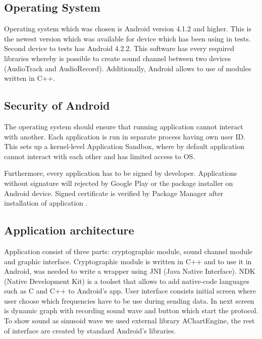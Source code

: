 \documentclass[11pt,titlepage]{article}
\theoremstyle{plain}
\begin{document}
\subsection{Operating System}

Operating system which was chosen is Android version 4.1.2 and higher. This is the newest version which was available for device which has been using in tests. Second device to tests has Android 4.2.2. This software has every required libraries whereby is possible to create sound channel between two devices (AudioTrack and AudioRecord). Additionally, Android allows to use of modules written in C++. 

\subsection{Security of Android}

The operating system should ensure that running application cannot interact with another. Each application is run in separate process having  own user ID. This sets up a kernel-level Application Sandbox, where by default application cannot interact with each other and has limited access to OS.

\vspace{5mm}

Furthermore, every application has to be signed by developer. Applications without signature will rejected by Google Play or the package installer on Android device. Signed certificate is verified by Package Manager after installation of application \cite{android_sec}.

\subsection{Application architecture}

Application consist of three parts: cryptographic module, sound channel module and graphic interface. Cryptographic module is written in C++ and to use it in Android, was needed to write a wrapper using JNI (Java Native Interface). NDK (Native Development Kit) is a toolset that allows to add native-code languages such as C and C++ to Android's app. User interface consists initial screen where user choose which frequencies have to be use during sending data. In next screen is dynamic graph with recording sound wave and button which start the protocol. To show sound as sinusoid wave we used external library AChartEngine, the rest of interface are created by standard Android's libraries.
\end{document}
